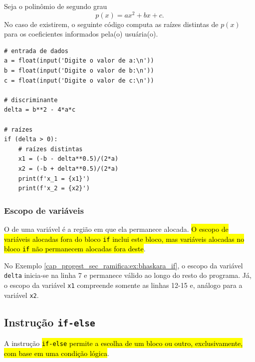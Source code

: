 \begin{ex}\label{cap_progest_sec_ramifica:ex:bhaskara_if}
  Seja o polinômio de segundo grau
  \begin{equation}
    p(x) = ax^2 + bx + c.
  \end{equation}
  No caso de existirem, o seguinte código computa as raízes distintas de $p(x)$ para os coeficientes informados pela(o) usuária(o).

\begin{lstlisting}
# entrada de dados
a = float(input('Digite o valor de a:\n'))
b = float(input('Digite o valor de b:\n'))
c = float(input('Digite o valor de c:\n'))

# discriminante
delta = b**2 - 4*a*c

# raízes
if (delta > 0):
    # raízes distintas
    x1 = (-b - delta**0.5)/(2*a)
    x2 = (-b + delta**0.5)/(2*a)
    print(f'x_1 = {x1}')
    print(f'x_2 = {x2}')
\end{lstlisting}

\end{ex}

\subsubsection{Escopo de variáveis}

O  de uma variável é a região em que ela permanece alocada. \hl{O escopo de variáveis alocadas fora do bloco \texttt{if} inclui este bloco, mas variáveis alocadas no bloco \texttt{if} não permanecem alocadas fora deste}.

\begin{ex}
  No Exemplo \ref{cap_progest_sec_ramifica:ex:bhaskara_if}, o escopo da variável \lstinline+delta+ inicia-se na linha 7 e permanece válido ao longo do resto do programa. Já, o escopo da variável \lstinline+x1+ compreende somente as linhas 12-15 e, análogo para a variável \lstinline+x2+. 
\end{ex}

\subsection{Instrução \texttt{if-else}}

A instrução \hl{\texttt{if-else} permite a escolha de um bloco ou outro, exclusivamente, com base em uma condição lógica}.

